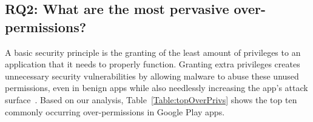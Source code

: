\documentclass{llncs}
\begin{document}





\subsection{RQ2: What are the most pervasive over-permissions?}

A basic security principle is the granting of the least amount of privileges to an application that it needs to properly function. Granting extra privileges creates unnecessary security vulnerabilities by allowing malware to abuse these unused permissions, even in benign apps while also needlessly increasing the app's attack surface~\cite{Bartel:2012:ASP:2351676.2351722}. Based on our analysis, Table~\ref{Table:topOverPrivs} shows the top ten commonly occurring over-permissions in Google Play apps.




\end{document}
